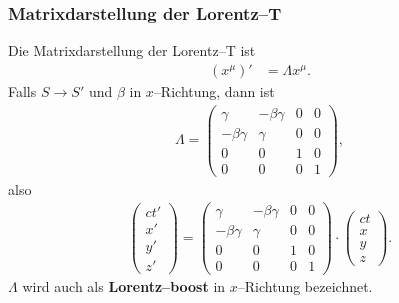 \documentclass[a4paper,12pt]{article}
\begin{document}
\subsubsection{Matrixdarstellung der Lorentz--T}
Die Matrixdarstellung der Lorentz--T ist
\begin{align*} 
        \left(x^\mu \right)'&=\Lambda x^\mu 
.\end{align*} 
Falls $S\rightarrow S'$ und $\beta $ in $x$--Richtung, dann ist 
\begin{align*} 
        \Lambda =\begin{pmatrix}
                \gamma &-\beta \gamma &0&0\\
                -\beta \gamma &\gamma &0&0\\
                0&0&1&0\\
                0&0&0&1
        \end{pmatrix}
,\end{align*} 
also
\begin{align*} 
        \begin{pmatrix}
                ct'\\x'\\y'\\z'
        \end{pmatrix}=\begin{pmatrix}
                \gamma &-\beta \gamma &0&0\\
                -\beta \gamma &\gamma &0&0\\
                0&0&1&0\\
                0&0&0&1
        \end{pmatrix}\cdot \begin{pmatrix}
                ct\\x\\y\\z
        \end{pmatrix}
.\end{align*} 
$\Lambda $ wird auch als \textbf{Lorentz--boost} in $x$--Richtung bezeichnet.
\end{document}

